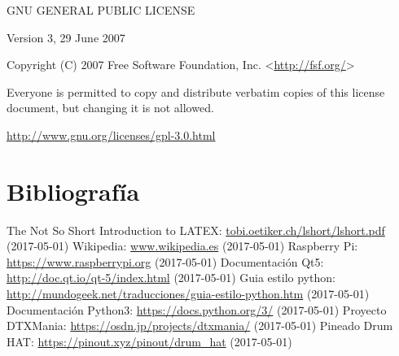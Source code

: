 \documentclass[a4paper,11pt,oneside]{book}
\begin{document}
\begin{center}
GNU GENERAL PUBLIC LICENSE
\end{center}
            
\begin{center}
Version 3, 29 June 2007
\end{center}


 \begin{center}
 Copyright (C) 2007 Free Software Foundation, Inc. <\url{http://fsf.org/}>
 \end{center}

 Everyone is permitted to copy and distribute verbatim copies of this license document, but changing it is not allowed.


\url{http://www.gnu.org/licenses/gpl-3.0.html}



\printnoidxglossaries

\chapter {Bibliografía}
\begin{thebibliography}{99}
 The Not So Short Introduction to LATEX: \url{tobi.oetiker.ch/lshort/lshort.pdf} 
(2017-05-01)
 Wikipedia: \url{www.wikipedia.es} (2017-05-01)
 Raspberry Pi: \url{https://www.raspberrypi.org} (2017-05-01)
 Documentación Qt5: \url{http://doc.qt.io/qt-5/index.html} (2017-05-01)
 Guia estilo python: \url{http://mundogeek.net/traducciones/guia-estilo-python.htm} 
(2017-05-01)
 Documentación Python3: \url{https://docs.python.org/3/} (2017-05-01)
 Proyecto DTXMania: \url{https://osdn.jp/projects/dtxmania/} (2017-05-01)
 Pineado Drum HAT: \url{https://pinout.xyz/pinout/drum_hat} (2017-05-01)
\end{thebibliography}
\end{document}
